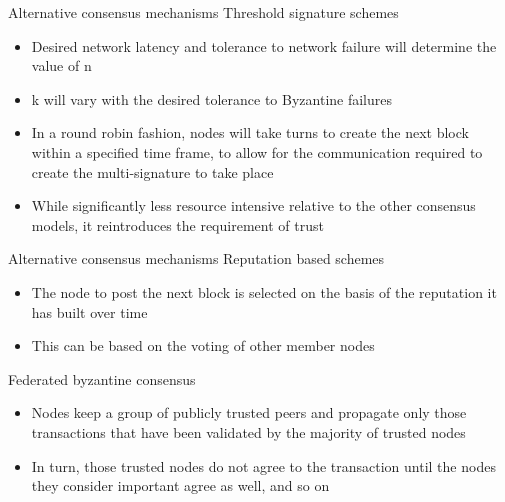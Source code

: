 \documentclass[10pt]{beamer}
\begin{document}

\begin{frame}{Alternative consensus mechanisms}
	Threshold signature schemes
	\begin{itemize}
		\item Desired network latency and tolerance to network failure will determine the value of n
		\item k will vary with the desired tolerance to Byzantine failures
		\item In a round robin fashion, nodes will take turns to create the next block within a specified time frame, to allow for the communication required to create the multi-signature to take place
		\item While significantly less resource intensive relative to the other consensus models, it reintroduces the requirement of trust
	\end{itemize}
\end{frame}


\begin{frame}{Alternative consensus mechanisms}
	Reputation based schemes
	\begin{itemize}
		\item The node to post the next block is selected on the basis of the reputation it has built over time
		\item This can be based on the voting of other member nodes
	\end{itemize}
	Federated byzantine consensus
	\begin{itemize}
		\item Nodes keep a group of publicly trusted peers and propagate only those transactions that have been validated by the majority of trusted nodes
		\item In turn, those trusted nodes do not agree to the transaction until the nodes they consider important agree as well, and so on
	\end{itemize}
\end{frame}

\end{document}

